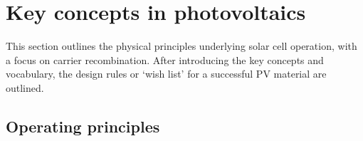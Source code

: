 







\section{Key concepts in photovoltaics}

This section outlines the physical principles underlying solar cell operation, with a focus on carrier recombination. After introducing the key concepts and vocabulary, the design rules or `wish list' for a successful PV material are outlined. 

\subsection{Operating principles} \label{operatingprinciples}

